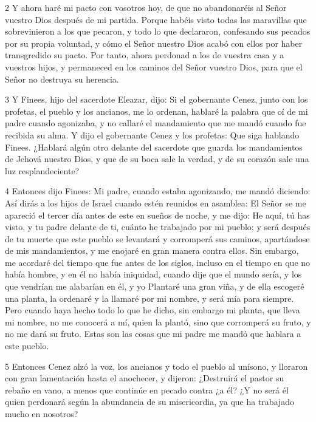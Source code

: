 \par 2 Y ahora haré mi pacto con vosotros hoy, de que no abandonaréis al Señor vuestro Dios después de mi partida. Porque habéis visto todas las maravillas que sobrevinieron a los que pecaron, y todo lo que declararon, confesando sus pecados por su propia voluntad, y cómo el Señor nuestro Dios acabó con ellos por haber transgredido su pacto. Por tanto, ahora perdonad a los de vuestra casa y a vuestros hijos, y permaneced en los caminos del Señor vuestro Dios, para que el Señor no destruya su herencia.

\par 3 Y Finees, hijo del sacerdote Eleazar, dijo: Si el gobernante Cenez, junto con los profetas, el pueblo y los ancianos, me lo ordenan, hablaré la palabra que oí de mi padre cuando agonizaba, y no callaré el mandamiento que me mandó cuando fue recibida su alma. Y dijo el gobernante Cenez y los profetas: Que siga hablando Finees. ¿Hablará algún otro delante del sacerdote que guarda los mandamientos de Jehová nuestro Dios, y que de su boca sale la verdad, y de su corazón sale una luz resplandeciente?

\par 4 Entonces dijo Finees: Mi padre, cuando estaba agonizando, me mandó diciendo: Así dirás a los hijos de Israel cuando estén reunidos en asamblea: El Señor se me apareció el tercer día antes de este en sueños de noche, y me dijo: He aquí, tú has visto, y tu padre delante de ti, cuánto he trabajado por mi pueblo; y será después de tu muerte que este pueblo se levantará y corromperá sus caminos, apartándose de mis mandamientos, y me enojaré en gran manera contra ellos. Sin embargo, me acordaré del tiempo que fue antes de los siglos, incluso en el tiempo en que no había hombre, y en él no había iniquidad, cuando dije que el mundo sería, y los que vendrían me alabarían en él, y yo Plantaré una gran viña, y de ella escogeré una planta, la ordenaré y la llamaré por mi nombre, y será mía para siempre. Pero cuando haya hecho todo lo que he dicho, sin embargo mi planta, que lleva mi nombre, no me conocerá a mí, quien la plantó, sino que corromperá su fruto, y no me dará su fruto. Estas son las cosas que mi padre me mandó que hablara a este pueblo.

\par 5 Entonces Cenez alzó la voz, los ancianos y todo el pueblo al unísono, y lloraron con gran lamentación hasta el anochecer, y dijeron: ¿Destruirá el pastor su rebaño en vano, a menos que continúe en pecado contra ¿a él? ¿Y no será él quien perdonará según la abundancia de su misericordia, ya que ha trabajado mucho en nosotros?

